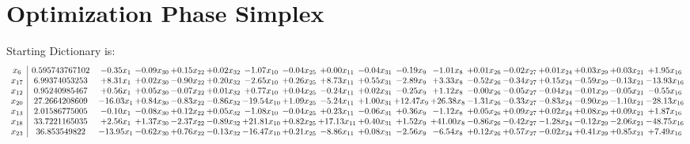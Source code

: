 \documentclass[9pt]{article}
\begin{document}
\section{Optimization Phase Simplex}
Starting Dictionary is:
\[\begin{array}{c| c c@{\hskip 2pt} c@{\hskip 2pt} c@{\hskip 2pt} c@{\hskip 2pt} c@{\hskip 2pt} c@{\hskip 2pt} c@{\hskip 2pt} c@{\hskip 2pt} c@{\hskip 2pt} c@{\hskip 2pt} c@{\hskip 2pt} c@{\hskip 2pt} c@{\hskip 2pt} c@{\hskip 2pt} c@{\hskip 2pt} c@{\hskip 2pt} }
 x_{6}   &  0.595743767102 & -0.35 x_{1} & -0.09 x_{30} & +  0.15 x_{22} & +  0.02 x_{32} & -1.07 x_{10} & -0.04 x_{25} & +  0.00 x_{11} & -0.04 x_{31} & -0.19 x_{9} & -1.01 x_{8} & +  0.01 x_{26} & -0.02 x_{27} & +  0.01 x_{24} & +  0.03 x_{29} & +  0.03 x_{21} & +  1.95 x_{16}\\
 x_{17}   &  6.99374053253 & +  8.31 x_{1} & +  0.02 x_{30} & -0.90 x_{22} & +  0.20 x_{32} & -2.65 x_{10} & +  0.26 x_{25} & +  8.73 x_{11} & +  0.55 x_{31} & -2.89 x_{9} & +  3.33 x_{8} & -0.52 x_{26} & -0.34 x_{27} & +  0.15 x_{24} & -0.59 x_{29} & -0.13 x_{21} & -13.93 x_{16}\\
 x_{12}   &  0.95240985467 & +  0.56 x_{1} & +  0.05 x_{30} & -0.07 x_{22} & +  0.01 x_{32} & +  0.77 x_{10} & +  0.04 x_{25} & -0.24 x_{11} & +  0.02 x_{31} & -0.25 x_{9} & +  1.12 x_{8} & -0.00 x_{26} & -0.05 x_{27} & -0.04 x_{24} & -0.01 x_{29} & -0.05 x_{21} & -0.55 x_{16}\\
 x_{20}   &  27.2664208609 & -16.03 x_{1} & +  0.84 x_{30} & -0.83 x_{22} & -0.86 x_{32} & -19.54 x_{10} & +  1.09 x_{25} & -5.24 x_{11} & +  1.00 x_{31} & + 12.47 x_{9} & + 26.38 x_{8} & -1.31 x_{26} & -0.33 x_{27} & -0.83 x_{24} & -0.90 x_{29} & -1.10 x_{21} & -28.13 x_{16}\\
 x_{13}   &  2.01586775005 & -0.10 x_{1} & -0.08 x_{30} & +  0.12 x_{22} & +  0.05 x_{32} & -1.08 x_{10} & -0.04 x_{25} & +  0.23 x_{11} & -0.06 x_{31} & +  0.36 x_{9} & -1.12 x_{8} & +  0.05 x_{26} & +  0.09 x_{27} & +  0.02 x_{24} & +  0.08 x_{29} & +  0.09 x_{21} & +  1.87 x_{16}\\
 x_{18}   &  33.7221165035 & +  2.56 x_{1} & +  1.37 x_{30} & -2.37 x_{22} & -0.89 x_{32} & + 21.81 x_{10} & +  0.82 x_{25} & + 17.13 x_{11} & +  0.40 x_{31} & +  1.52 x_{9} & + 41.00 x_{8} & -0.86 x_{26} & -0.42 x_{27} & -1.28 x_{24} & -0.12 x_{29} & -2.06 x_{21} & -48.75 x_{16}\\
 x_{23}   &  36.853549822 & -13.95 x_{1} & -0.62 x_{30} & +  0.76 x_{22} & -0.13 x_{32} & -16.47 x_{10} & +  0.21 x_{25} & -8.86 x_{11} & +  0.08 x_{31} & -2.56 x_{9} & -6.54 x_{8} & +  0.12 x_{26} & +  0.57 x_{27} & -0.02 x_{24} & +  0.41 x_{29} & +  0.85 x_{21} & +  7.49 x_{16}\\

\end{array}\]
\end{document}
